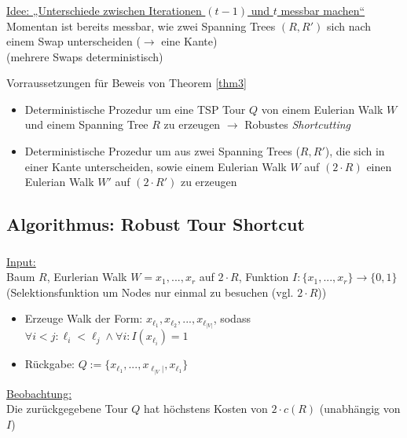 \begin{frame}
    \frametitle{\insertsubsection}
    \underline{Idee: „Unterschiede zwischen Iterationen $(t-1)$ und $t$ messbar machen“}\\
    \vspace{0.8em}
    Momentan ist bereits messbar, wie zwei Spanning Trees $(R, R')$ sich nach einem Swap unterscheiden ($\rightarrow$ eine Kante)\\
    (mehrere Swaps deterministisch)\\
    \vspace{0.8em}
    \begin{block}{Vorraussetzungen für Beweis von Theorem \ref{thm3}}
        \vspace{0.8em}
        \begin{itemize}
            \itemsep\setlength{.8em}
            \item Deterministische Prozedur um eine TSP Tour $Q$ von einem Eulerian Walk $W$ und einem Spanning Tree $R$ zu erzeugen $\rightarrow$ Robustes \emph{Shortcutting}
            \item Deterministische Prozedur um aus zwei Spanning Trees ($R, R'$), die sich in einer Kante unterscheiden, sowie einem Eulerian Walk $W$ auf $(2\cdot R)$ einen Eulerian Walk $W'$ auf $(2\cdot R')$ zu erzeugen 
        \end{itemize}
        \vspace{0.1em}
    \end{block}
\end{frame}

\subsection{Algorithmus: Robust Tour Shortcut}
\begin{frame}
    \frametitle{\insertsubsection}
    \underline{Input:}\\
    \vspace{.8em}
    Baum $R$, Eurlerian Walk $W = x_1, ..., x_r$ auf $2\cdot R$, Funktion $I: \{x_1,...,x_r\} \rightarrow \{0, 1\}$ (Selektionsfunktion um Nodes nur einmal zu besuchen (vgl. $2\cdot R$))
    \vspace{1em}
    \begin{itemize}
        \itemsep\setlength{.8em}
        \item Erzeuge Walk der Form: $x_{\ell_1}, x_{\ell_2},..., x_{\ell_{|V|}}$, sodass $\forall i<j: {\ell_i} < {\ell_j} \wedge \forall i: I(x_{\ell_i}) = 1$
        \item Rückgabe: $Q := \{x_{\ell_1},..., x_{\ell_{|V}|},x_{\ell_1}\}$
    \end{itemize}
    \vspace{.8em}
    \underline{Beobachtung:}\\
    \vspace{.8em}
    Die zurückgegebene Tour $Q$ hat höchstens Kosten von $2\cdot c(R)$ (unabhängig von $I$)
\end{frame}

